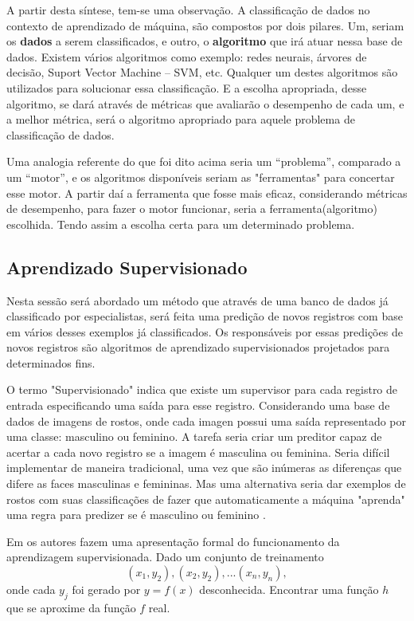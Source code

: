 A partir desta síntese, tem-se uma observação. A classificação de dados no contexto de aprendizado de máquina, são compostos por dois pilares. Um, seriam os \textbf{dados} a serem classificados, e outro, o \textbf{algoritmo} que irá atuar nessa base de dados. Existem vários algoritmos como exemplo: redes neurais, árvores de decisão, Suport Vector Machine – SVM, etc. Qualquer um destes algoritmos são utilizados para solucionar essa classificação. E a escolha apropriada, desse algoritmo, se dará através de métricas que avaliarão o desempenho de cada um, e a melhor métrica, será o algoritmo apropriado para aquele problema de classificação de dados. 

Uma analogia referente do que foi dito acima seria um “problema”,  comparado a um “motor”, e os algoritmos disponíveis seriam as "ferramentas" para concertar esse motor. A partir daí a ferramenta que fosse mais eficaz, considerando métricas de desempenho, para fazer o motor funcionar, seria a ferramenta(algoritmo) escolhida. Tendo assim a escolha certa para um determinado problema.

\subsection{Aprendizado Supervisionado}\label{ssec:aprendSup}

Nesta sessão será abordado um método que através de uma banco de dados já classificado por especialistas, será feita uma predição de novos registros com base em vários desses exemplos já classificados. Os responsáveis por essas predições de novos registros são algoritmos de aprendizado supervisionados projetados para determinados fins.


O termo "Supervisionado" indica que existe um supervisor para cada registro de entrada especificando uma saída para esse registro. Considerando uma base de dados de imagens de rostos, onde cada imagen possui uma saída representado por uma classe: masculino ou feminino. A tarefa seria criar um preditor capaz de acertar a cada novo registro se a imagem é masculina ou feminina. Seria  difícil  implementar de maneira tradicional, uma vez que são inúmeras as diferenças que difere as faces masculinas e femininas. Mas uma alternativa seria dar exemplos de rostos com suas classificações de fazer que automaticamente a máquina "aprenda" uma regra para predizer se é masculino ou feminino \cite{Barber2011}.

Em \cite{RusselStuart.Norvig2013} os autores fazem uma apresentação formal do funcionamento da aprendizagem supervisionada. Dado um conjunto de treinamento 
\begin{equation}
 (x_{1},y_{2}),(x_{2},y_{2}),...(x_{n},y_{n}),
 \label{eq:aprendSup}
\end{equation}
onde cada ${y_{j}} $ foi gerado por ${y=f(x)}$ desconhecida. Encontrar uma função ${h}$ que se aproxime da função ${f}$ real.

